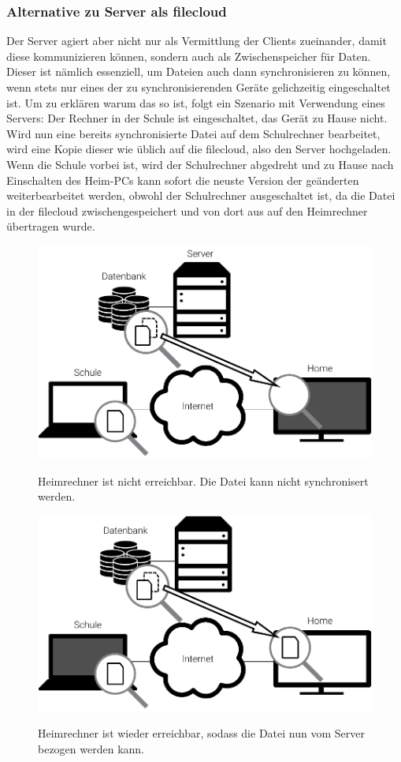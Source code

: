 \subsubsection{Alternative zu Server als \gls{filecloud}}
Der Server agiert aber nicht nur als Vermittlung der Clients zueinander, damit diese
kommunizieren können, sondern auch als Zwischenspeicher für Daten. Dieser ist nämlich
essenziell, um Dateien auch dann synchronisieren zu können, wenn stets nur eines der
zu synchronisierenden Geräte gelichzeitig eingeschaltet ist. Um zu erklären warum das
so ist, folgt ein Szenario mit Verwendung eines Servers:
Der Rechner in der Schule ist eingeschaltet, das Gerät zu Hause nicht. Wird nun
eine bereits synchronisierte Datei auf dem Schulrechner bearbeitet, wird eine Kopie dieser wie
üblich auf die \gls{filecloud}, also den Server hochgeladen. Wenn die Schule vorbei ist,
wird der Schulrechner abgedreht und zu Hause nach Einschalten des Heim-PCs kann sofort die neuste Version der
geänderten weiterbearbeitet werden, obwohl der Schulrechner ausgeschaltet ist, da die Datei in der \gls{filecloud}
zwischengespeichert und von dort aus auf den Heimrechner übertragen wurde.
\begin{figure}[H]
	\centering
  \includegraphics[]{images/dropbox_temp_1}
	\label{dropbox_temp_1}
  \caption{Heimrechner ist nicht erreichbar. Die Datei kann nicht synchronisert werden.}
\end{figure}

\begin{figure}[H]
	\centering
  \includegraphics[]{images/dropbox_temp_2}
	\label{dropbox_temp_2}
  \caption{Heimrechner ist wieder erreichbar, sodass die Datei nun vom Server
	bezogen werden kann.}
\end{figure}

